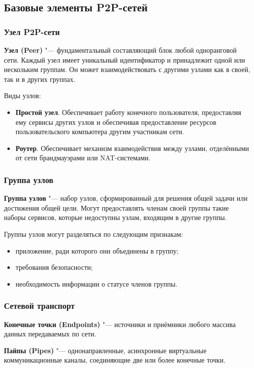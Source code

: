 \documentclass[bachelor, och, coursework]{SCWorks}
\begin{document}
\subsection{Базовые элементы P2P-сетей}
\subsubsection{Узел P2P-сети}
\textbf{Узел (Peer)} "--- фундаментальный составляющий блок любой одноранговой сети. 
Каждый узел имеет уникальный идентификатор и принадлежит одной или нескольким группам. 
Он может взаимодействовать с другими узлами как в своей, так и в других группах. \cite{P2P_2}

Виды узлов:
\begin{itemize}
    \item \textbf{Простой узел}. Обеспечивает работу конечного пользователя, предоставляя ему сервисы других узлов и	
    обеспечивая предоставление ресурсов пользовательского компьютера другим	участникам сети.
    \item \textbf{Роутер}. Обеспечивает механизм взаимодействия между узлами, отделёнными от сети брандмауэрами или NAT-системами.	
\end{itemize}

\subsubsection{Группа узлов}
\textbf{Группа узлов} "--- набор узлов, сформированный для решения общей задачи или достижения общей цели. 
Могут предоставлять членам своей группы такие наборы сервисов, которые недоступны узлам, входящим в другие группы.

Группы узлов могут разделяться по следующим признакам:
\begin{itemize}
    \item приложение, ради которого они объединены в группу;
    \item требования безопасности;
    \item необходимость информации о статусе членов группы.
\end{itemize}

\subsubsection{Сетевой транспорт}
\textbf{Конечные точки (Endpoints)} "--- источники и приёмники любого массива данных передаваемых по сети.

\textbf{Пайпы (Pipes)} "--- однонаправленные, асинхронные виртуальные коммуникационные каналы, соединяющие две или более конечные точки.
\end{document}
